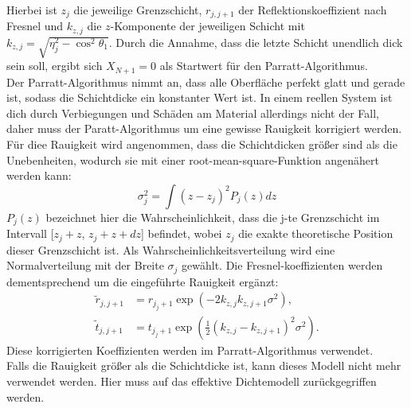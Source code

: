 Hierbei ist $z_j$ die jeweilige Grenzschicht, $r_{j,j+1}$ der Reflektionskoeffizient nach Fresnel und $k_{z,j}$ die $z$-Komponente der jeweiligen Schicht mit $k_{z,j} = \sqrt{\eta_j^2 - \cos^2{\theta_1}}$. Durch
die Annahme, dass die letzte Schicht unendlich dick sein soll, ergibt sich $X_{N+1} =0$ als Startwert für den Parratt-Algorithmus.\\
Der Parratt-Algorithmus nimmt an, dass alle Oberfläche perfekt glatt und gerade ist, sodass die Schichtdicke ein konstanter Wert ist. In einem reellen System ist dich durch Verbiegungen und Schäden am Material allerdings
nicht der Fall, daher muss der Paratt-Algorithmus um eine gewisse Rauigkeit korrigiert werden. Für diee Rauigkeit wird angenommen, dass die Schichtdicken größer sind als die Unebenheiten, wodurch sie mit 
einer root-mean-square-Funktion angenähert werden kann:
\begin{equation}
    \label{eqn:rauigkeit}
    \sigma_j^2 = \int (z-z_j)^2P_j(z)dz
\end{equation}
$P_j(z)$ bezeichnet hier die Wahrscheinlichkeit, dass die j-te Grenzschicht im Intervall [$z_j+z$, $z_j+z+dz$] befindet, wobei $z_j$ die exakte theoretische Position dieser Grenzschicht ist. Als Wahrscheinlichkeitsverteilung
wird eine Normalverteilung mit der Breite $\sigma_j$ gewählt. Die Fresnel-koeffizienten werden dementsprechend um die eingeführte Rauigkeit ergänzt:
\begin{align}
    \label{eqn:fresnel_ref}
    \tilde{r}_{j,j+1} &= r_{j_j+1} \exp{(-2k_{z,j}k_{z,j+1}\sigma^2)},\\
    \tilde{t}_{j,j+1} &=  t_{j_j+1} \exp{(\frac{1}{2}(k_{z,j}-k_{z,j+1})^2\sigma^2)}.
\end{align}
Diese korrigierten Koeffizienten werden im Parratt-Algorithmus verwendet. \\
Falls die Rauigkeit größer als die Schichtdicke ist, kann dieses Modell nicht mehr verwendet werden. Hier muss auf das effektive Dichtemodell zurückgegriffen werden.

